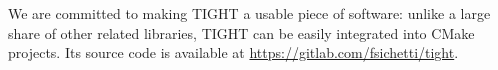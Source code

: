 We are committed to making TIGHT a usable piece of software: unlike a large share of other related libraries, TIGHT can be easily integrated into CMake projects. Its source code is available at \url{https://gitlab.com/fsichetti/tight}.







